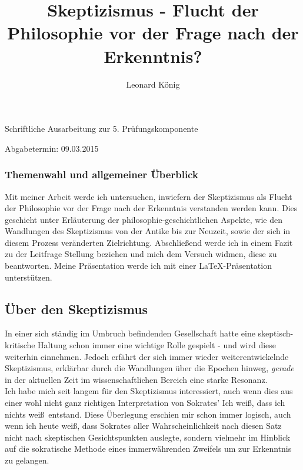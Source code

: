 \documentclass[12pt,a4paper,final]{article}
\title{Skeptizismus - Flucht der Philosophie vor der Frage nach der Erkenntnis?}
\author{Leonard König}
\begin{document}
%
\maketitle
\begin{Large}
\begin{center}
Schriftliche Ausarbeitung zur 5. Prüfungskomponente
\end{center}
\end{Large}
\vspace{100pt}
\begin{Large}
\begin{center}
Abgabetermin: 09.03.2015
\end{center}
\end{Large}
\pagebreak
%
\setcounter{page}{2}
%
%
%
\subsubsection*{Themenwahl und allgemeiner Überblick}
Mit meiner Arbeit werde ich untersuchen, inwiefern der Skeptizismus als Flucht der Philosophie vor der Frage nach der Erkenntnis verstanden werden kann. Dies geschieht unter Erläuterung der philosophie-geschichtlichen Aspekte, wie den Wandlungen des Skeptizismus von der Antike bis zur Neuzeit, sowie der sich in diesem Prozess veränderten Zielrichtung. Abschließend werde ich in einem Fazit zu der Leitfrage Stellung beziehen und mich dem Versuch widmen, diese zu beantworten. Meine Präsentation werde ich mit einer %
 \LaTeX -Präsentation unterstützen.
\subsection*{Über den Skeptizismus}
In einer sich ständig im Umbruch befindenden Gesellschaft hatte eine skeptisch-kritische Haltung schon immer eine wichtige Rolle gespielt - und wird diese weiterhin einnehmen. Jedoch erfährt der sich immer wieder weiterentwickelnde Skeptizismus, erklärbar durch die Wandlungen über die Epochen hinweg, \emph{gerade} in der aktuellen Zeit im wissenschaftlichen Bereich eine starke Resonanz.\\%

Ich habe mich seit langem für den Skeptizismus interessiert, auch wenn dies aus einer wohl nicht ganz richtigen Interpretation von Sokrates' \glqq Ich weiß, dass ich nichts weiß\grqq\ entstand. Diese Überlegung erschien mir schon immer logisch, auch wenn ich heute weiß, dass Sokrates aller Wahrscheinlichkeit nach diesen Satz nicht nach skeptischen Gesichtspunkten auslegte, sondern vielmehr im Hinblick auf die sokratische Methode eines immerwährenden Zweifels um zur Erkenntnis zu gelangen.\\
\end{document}

